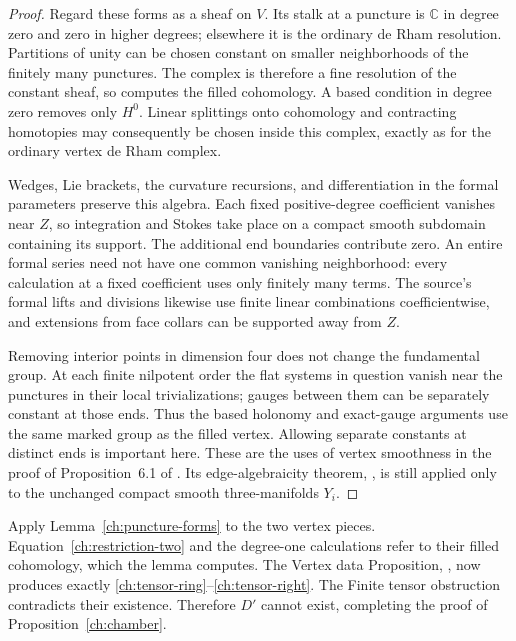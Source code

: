 \begin{proof}
Regard these forms as a sheaf on $V$.  Its stalk at a puncture is
$\mathbb C$ in degree zero and zero in higher degrees; elsewhere
it is the ordinary de Rham resolution.  Partitions of unity can
be chosen constant on smaller neighborhoods of the finitely many
punctures.  The complex is therefore a fine resolution of the
constant sheaf, so computes the filled cohomology.  A based condition
in degree zero removes only $H^0$.  Linear splittings onto cohomology
and contracting homotopies may consequently be chosen inside this
complex, exactly as for the ordinary vertex de Rham complex.

Wedges, Lie brackets, the curvature recursions, and differentiation
in the formal parameters preserve this algebra.  Each fixed
positive-degree coefficient vanishes near $Z$, so integration and
Stokes take place on a compact smooth subdomain containing its
support.  The additional end boundaries contribute zero.  An entire
formal series need not have one common vanishing neighborhood:
every calculation at a fixed coefficient uses only finitely many
terms.  The source's formal lifts and divisions likewise use
finite linear combinations coefficientwise, and extensions from
face collars can be supported away from $Z$.

Removing interior points in dimension four does not change the
fundamental group.  At each finite nilpotent order the flat systems
in question vanish near the punctures in their local trivializations;
gauges between them can be separately constant at those ends.
Thus the based holonomy and exact-gauge arguments use the same
marked group as the filled vertex.  Allowing separate constants
at distinct ends is important here.  These are the uses of vertex
smoothness in the proof of Proposition~6.1 of \cite{TO}.
Its edge-algebraicity theorem, \cite[Theorem~5.1]{TO},
is still applied only to the unchanged compact smooth
three-manifolds $Y_i$.
\end{proof}

Apply Lemma~\ref{ch:puncture-forms} to the two vertex pieces.
Equation~\eqref{ch:restriction-two} and the degree-one calculations
refer to their filled cohomology, which the lemma computes.  The
Vertex data Proposition, \cite[Proposition~6.1]{TO}, now produces exactly
\eqref{ch:tensor-ring}--\eqref{ch:tensor-right}.  The Finite tensor
obstruction contradicts their existence.  Therefore $D'$ cannot
exist, completing the proof of Proposition~\ref{ch:chamber}.

